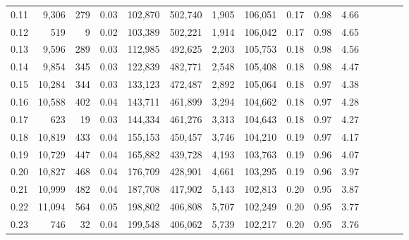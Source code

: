 \begin{tabular}{rrrcrrrrrrrrrrr}
0.11 &   9,306 &    279 &                                       0.03 &  102,870 &  502,740 &    1,905 &  106,051 &  0.17 &  0.98 &                         4.66 \\
0.12 &     519 &      9 &                                       0.02 &  103,389 &  502,221 &    1,914 &  106,042 &  0.17 &  0.98 &                         4.65 \\
0.13 &   9,596 &    289 &                                       0.03 &  112,985 &  492,625 &    2,203 &  105,753 &  0.18 &  0.98 &                         4.56 \\
0.14 &   9,854 &    345 &                                       0.03 &  122,839 &  482,771 &    2,548 &  105,408 &  0.18 &  0.98 &                         4.47 \\
0.15 &  10,284 &    344 &                                       0.03 &  133,123 &  472,487 &    2,892 &  105,064 &  0.18 &  0.97 &                         4.38 \\
0.16 &  10,588 &    402 &                                       0.04 &  143,711 &  461,899 &    3,294 &  104,662 &  0.18 &  0.97 &                         4.28 \\
0.17 &     623 &     19 &                                       0.03 &  144,334 &  461,276 &    3,313 &  104,643 &  0.18 &  0.97 &                         4.27 \\
0.18 &  10,819 &    433 &                                       0.04 &  155,153 &  450,457 &    3,746 &  104,210 &  0.19 &  0.97 &                         4.17 \\
0.19 &  10,729 &    447 &                                       0.04 &  165,882 &  439,728 &    4,193 &  103,763 &  0.19 &  0.96 &                         4.07 \\
0.20 &  10,827 &    468 &                                       0.04 &  176,709 &  428,901 &    4,661 &  103,295 &  0.19 &  0.96 &                         3.97 \\
0.21 &  10,999 &    482 &                                       0.04 &  187,708 &  417,902 &    5,143 &  102,813 &  0.20 &  0.95 &                         3.87 \\
0.22 &  11,094 &    564 &                                       0.05 &  198,802 &  406,808 &    5,707 &  102,249 &  0.20 &  0.95 &                         3.77 \\
0.23 &     746 &     32 &                                       0.04 &  199,548 &  406,062 &    5,739 &  102,217 &  0.20 &  0.95 &                         3.76 \\

\end{tabular}
